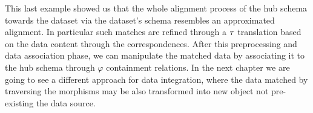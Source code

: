 This last example showed us that the whole alignment  process of the hub schema towards the dataset via the dataset's schema resembles an approximated alignment. In particular such matches are refined through a $\ttransl$ translation  based on the data content  through the correspondences.
After this preprocessing and data association phase, we can manipulate the matched data by associating it to the hub schema through $\varphi$ containment relations. In the next chapter we are going to see a different approach for data integration, where the data matched by traversing the morphisms may be also transformed into new object not pre-existing the data source.